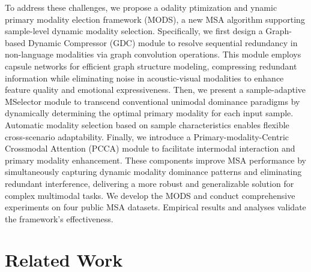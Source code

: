 \documentclass[letterpaper]{article} %
\begin{document}
To address these challenges, we propose a odality ptimization and ynamic primary modality election framework (MODS), a new MSA algorithm supporting sample-level dynamic modality selection. Specifically, we first design a Graph-based Dynamic Compressor (GDC) module to resolve sequential redundancy in non-language modalities via graph convolution operations. This module employs capsule networks \cite{sabour2017dynamic} for efficient graph structure modeling, compressing redundant information while eliminating noise in acoustic-visual modalities to enhance feature quality and emotional expressiveness. Then, we present a sample-adaptive MSelector module to transcend conventional unimodal dominance paradigms by dynamically determining the optimal primary modality for each input sample. Automatic modality selection based on sample characteristics enables flexible cross-scenario adaptability.  Finally, we introduce a Primary-modality-Centric Crossmodal Attention (PCCA) module to facilitate intermodal interaction and primary modality enhancement. These components improve MSA performance by simultaneously capturing dynamic modality dominance patterns and eliminating redundant interference, delivering a more robust and generalizable solution for complex multimodal tasks.
We develop the MODS and conduct comprehensive experiments on four public MSA datasets. Empirical results and analyses validate the framework’s effectiveness.

\section{Related Work}
\end{document}
